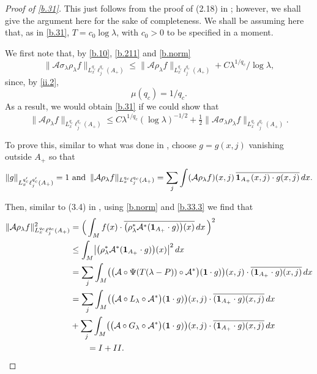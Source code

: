 \documentclass[10pt]{amsart}
\newcommand{\la}{\lambda}
\newcommand{\one}{{\bf 1}}
\newcommand{\1}{{\bf 1}}
\newcommand{\A}{{\mathcal A}}
\begin{document}
\begin{proof}[Proof of \eqref{b.31}]
This just follows from the proof of (2.18) in \cite{HSp}; however, we shall give the argument here for the sake
of completeness.  We shall be assuming
here that, as in \eqref{b.31}, $T=c_0\log\la$, with
$c_0>0$ to be specified in a moment.


We first note that, by \eqref{b.10}, \eqref{b.211} and \eqref{b.norm}
\begin{equation}\label{b.35}
\|\A \sigma_\la \rho_\la f\|_{L^{q_c}_x\ell^{q_c}_j(A_+)}
\le \|\A \rho_\la f\|_{L^{q_c}_x\ell^{q_c}_j(A_+)} + C\la^{1/q_c}/\log\la,
\end{equation}
since, by \eqref{ii.2},
$$\mu(q_c)=1/q_c.$$
As a result, we would obtain \eqref{b.31} if we could show that
\begin{equation}\label{b.36}
\|\A \rho_\la f\|_{L^{q_c}_x\ell^{q_c}_j(A_+)}
\le C\la^{1/q_c}(\log\la)^{-1/2}+\tfrac12 \|\A\sigma_\la \rho_\la f\|_{L^{q_c}_x\ell^{q_c}_j(A_+)}.
\end{equation}


To prove this, similar to what was done in \cite{HSp},
choose $g=g(x,j)$ vanishing outside $A_+$ so that
\begin{equation}\label{b.41}
\|g\|_{L^{q_c'}_x\ell^{q_c'}_j(A_+)}=1
\, \, 
\text{and } \, 
\|\A \rho_\la f\|_{L^{q_c}_x\ell^{q_c}_j(A_+)}
=\sum_j \int 
(\A \rho_\la f)(x,j) \,
\overline{\1_{A_+}(x,j) \cdot g(x,j)} \, dx.
\end{equation}


Then, similar to (3.4) in \cite{HSp},
using \eqref{b.norm} and \eqref{b.33.3} we find that
\begin{align*}
\|\A \rho_\la f\|^2_{L^{q_c}_x\ell^{q_c}_j(A_+)}
&=\Bigl(\, \int_M
f(x)\cdot \overline{\bigl(\rho_\la^*\A^*(
\1_{A_+}\cdot g)\bigr)(x)} \, dx\, \Bigr)^2
\\
&\le
\int_M \bigl| \bigl(\rho_\la^*\A^*(
\one_{A_+}\cdot g)\bigr)(x) \bigr|^2 \, dx
\\
&=\sum_j
\int_M \bigl(\bigl( \A\circ \Psi(T(\la-P))\circ \A^*
\bigr)(\1\cdot g)\bigr)(x,j) 
\cdot 
\overline{(\1_{A_+}\cdot g)(x,j)}\, dx
\\
&=\sum_j \int_M \bigl(\bigl( \A\circ L_\la\circ \A^*
\bigr)(\1\cdot g)\bigr)(x,j) 
\cdot 
\overline{(\1_{A_+}\cdot g)(x,j)}\, dx
\\
&+\sum_j \int_M \bigl(\bigl( \A\circ G_\la\circ \A^*
\bigr)(\1\cdot g)\bigr)(x,j) 
\cdot 
\overline{(\1_{A_+}\cdot g)(x,j)}\, dx
\\
&\qquad= I+II.
\end{align*}



\end{proof}
\end{document}
